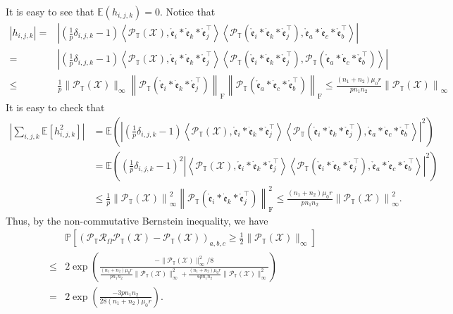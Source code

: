 \documentclass[twoside,12pt]{article}
\def\fro{{\mathrm{F}}}
\def\fro{{\mathrm{F}}}
\def\dme{{\dot{\mathfrak{e}}}}
\def\mrme{{\mathring{\mathfrak{e}}}}
\begin{document}
It is easy to see that $\mathbb{E}(h_{i,j,k})=0$. Notice that 
\begin{align*}
 |h_{i,j,k}|
=& \left|(\frac{1}{p} \delta_{i, j, k}-1)\left\langle\mathcal{P}_{\mathbb{T}}(\mathcal{X}),\mrme_i * \dme_k * \mrme_j^{\top}\right\rangle \left\langle \mathcal{P}_{\mathbb{T}}\left(\mrme_i * \dme_k * \mrme_j^{\top}\right),\mrme_a * \dme_c * \mrme_b^{\top}\right\rangle\right|\\
=&\left|(\frac{1}{p} \delta_{i, j, k}-1)\left\langle\mathcal{P}_{\mathbb{T}}(\mathcal{X}),\mrme_i * \dme_k * \mrme_j^{\top}\right\rangle\left\langle \mathcal{P}_{\mathbb{T}}\left(\mrme_i * \dme_k * \mrme_j^{\top}\right),\mathcal{P}_{\mathbb{T}}\left(\mrme_a * \dme_c * \mrme_b^{\top}\right)\right\rangle\right| \\
\leq & \frac{1}{p}\|\mathcal{P}_{\mathbb{T}}(\mathcal{X})\|_{\infty}\left\|\mathcal{P}_{\mathbb{T}}\left(\mrme_i * \dme_k * \mrme_j^{\top}\right)\right\|_{\fro}\left\|\mathcal{P}_{\mathbb{T}}\left(\mrme_a * \dme_c * \mrme_b^{\top}\right)\right\|_{\fro}
\leq\frac{(n_1+n_2)\mu_0r}{pn_{1}n_2}\left\|\mathcal{P}_{\mathbb{T}}(\mathcal{X})\right\|_{\infty}
\end{align*}
It is easy to check that  
\vspace{-3pt}
\begin{align*}
 \left|\sum\limits_{i,j,k}\mathbb{E}[h_{i,j,k}^2]\right|  
&=\mathbb{E}\left(\left| (\frac{1}{p} \delta_{i, j, k}-1)\left\langle\mathcal{P}_{\mathbb{T}}(\mathcal{X}),\mrme_i * \dme_k * \mrme_j^{\top}\right\rangle \left\langle\mathcal{P}_{\mathbb{T}}\left(\mrme_i * \dme_k * \mrme_j^{\top}\right),\mrme_a * \dme_c * \mrme_b^{\top}\right\rangle \right|^2 \right)\\
&=\mathbb{E}\left((\frac{1}{p} \delta_{i, j, k}-1)^2\left|\left\langle\mathcal{P}_{\mathbb{T}}(\mathcal{X}),\mrme_i * \dme_k * \mrme_j^{\top}\right\rangle  \left\langle\mathcal{P}_{\mathbb{T}}\left(\mrme_i * \dme_k * \mrme_j^{\top}\right),\mrme_a * \dme_c * \mrme_b^{\top}\right\rangle \right|^2 \right) \\
&\leq \frac{1}{p}\left\|\mathcal{P}_{\mathbb{T}}(\mathcal{X})\right\|_{\infty}^2\left\|\mathcal{P}_{\mathbb{T}}\left(\mrme_i * \dme_k * \mrme_j^{\top}\right)\right\|_{\fro}^2\leq \frac{(n_1+n_2)\mu_{0}r}{pn_{1}n_{2}}\left\|\mathcal{P}_{\mathbb{T}}(\mathcal{X})\right\|_{\infty}^2.
\end{align*}
Thus, by the non-commutative Bernstein inequality, we have 
\begin{align*}
& \mathbb{P}\left[\left(\mathcal{P}_{\mathbb{T}} \mathcal{R}_{\Omega} \mathcal{P}_{\mathbb{T}}(\mathcal{X})-\mathcal{P}_{\mathbb{T}}(\mathcal{X})\right)_{a, b, c} \geq \frac{1}{2}\|\mathcal{P}_{\mathbb{T}}(\mathcal{X})\|_{\infty}\right] \\
\leq & 2 \exp \left(\frac{-\|\mathcal{P}_{\mathbb{T}}(\mathcal{X})\|_{\infty}^2 /   8 }{\frac{(n_1 + n_2) \mu_0 r}{pn_{1}n_{2}}\|\mathcal{P}_{\mathbb{T}}(\mathcal{X})\|_{\infty}^2+\frac{(n_1 + n_2) \mu_0 r}{6pn_{1}n_{2}}\|\mathcal{P}_{\mathbb{T}}(\mathcal{X})\|_{\infty}^2}\right) \\
= & 2\exp\left(\frac{-3pn_{1}n_{2}}{28(n_1+n_2)\mu_{0}r}\right).
\end{align*}
\end{document}
